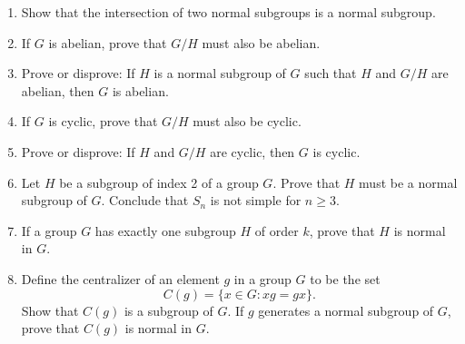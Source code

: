 {\begin{enumerate}
 
\item
Show that the intersection of two normal subgroups is a normal
subgroup. 
 
 
% 
% 
 
 

\item
If $G$ is abelian, prove that $G/H$ must also be abelian.
 
\item
Prove or disprove: If $H$ is a normal subgroup of $G$ such that $H$
and $G/H$ are abelian, then $G$ is abelian. 
 
 

\item
If $G$ is cyclic, prove that $G/H$ must also be cyclic.


\item
Prove or disprove: If $H$ and $G/H$ are cyclic, then $G$ is cyclic.
 
 
\item
Let $H$ be a subgroup of index 2 of a group $G$. Prove that $H$ must
be a normal subgroup of $G$. Conclude that $S_n$ is not simple for $n \geq 3$.

 
 

 
 
 
\item
If a group $G$ has exactly one subgroup $H$ of order $k$, prove that
$H$ is normal in $G$. 
 
 
% 
 
\item
Define the {\bfi centralizer\/} of an element $g$ in a group $G$
to be the set  
\[
C(g) = \{ x \in G : xg = gx \}.
\]
Show that $C(g)$ is a subgroup of $G$.  If $g$ generates a normal
subgroup of $G$, prove that $C(g)$ is normal in $G$.
 

\end{enumerate}}
